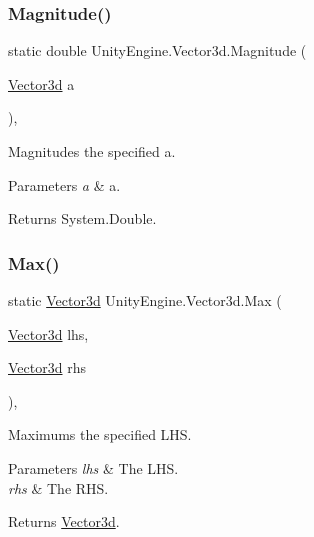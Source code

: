 \subsubsection{\texorpdfstring{Magnitude()}{Magnitude()}}
{\footnotesize\ttfamily static double Unity\+Engine.\+Vector3d.\+Magnitude (\begin{DoxyParamCaption}\item[{\hyperlink{struct_unity_engine_1_1_vector3d}{Vector3d}}]{a }\end{DoxyParamCaption})\hspace{0.3cm}{\ttfamily [inline]}, {\ttfamily [static]}}



Magnitudes the specified a. 


\begin{DoxyParams}{Parameters}
{\em a} & a.\\
\hline
\end{DoxyParams}
\begin{DoxyReturn}{Returns}
System.\+Double.
\end{DoxyReturn}
\mbox{\label{struct_unity_engine_1_1_vector3d_a5538dd876f4367f1111f47b01a8099ef}} 
\subsubsection{\texorpdfstring{Max()}{Max()}}
{\footnotesize\ttfamily static \hyperlink{struct_unity_engine_1_1_vector3d}{Vector3d} Unity\+Engine.\+Vector3d.\+Max (\begin{DoxyParamCaption}\item[{\hyperlink{struct_unity_engine_1_1_vector3d}{Vector3d}}]{lhs,  }\item[{\hyperlink{struct_unity_engine_1_1_vector3d}{Vector3d}}]{rhs }\end{DoxyParamCaption})\hspace{0.3cm}{\ttfamily [inline]}, {\ttfamily [static]}}



Maximums the specified L\+HS. 


\begin{DoxyParams}{Parameters}
{\em lhs} & The L\+HS.\\
\hline
{\em rhs} & The R\+HS.\\
\hline
\end{DoxyParams}
\begin{DoxyReturn}{Returns}
\hyperlink{struct_unity_engine_1_1_vector3d}{Vector3d}.
\end{DoxyReturn}
\mbox{\label{struct_unity_engine_1_1_vector3d_ae4576ef2e5181d8c81df5e7c4af22dbc}} 
